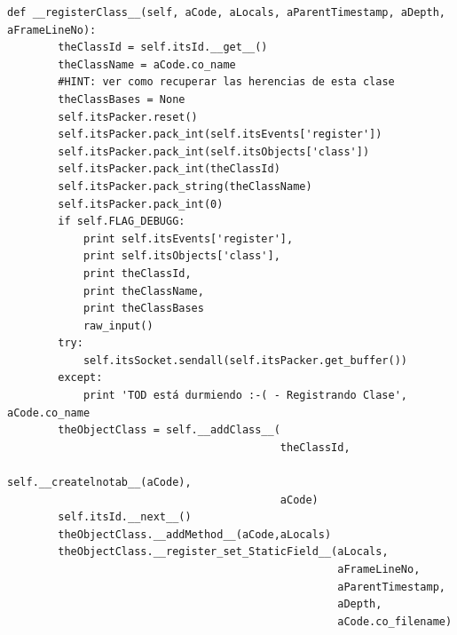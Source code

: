 \documentclass[12pt,legalpaper]{report}
\begin{document}
\begin{singlespace}
\begin{lstlisting}[style=Python]
    def __registerClass__(self, aCode, aLocals, aParentTimestamp, aDepth, aFrameLineNo):
        theClassId = self.itsId.__get__()
        theClassName = aCode.co_name
        #HINT: ver como recuperar las herencias de esta clase 
        theClassBases = None
        self.itsPacker.reset()
        self.itsPacker.pack_int(self.itsEvents['register'])
        self.itsPacker.pack_int(self.itsObjects['class'])
        self.itsPacker.pack_int(theClassId)
        self.itsPacker.pack_string(theClassName)
        self.itsPacker.pack_int(0)
        if self.FLAG_DEBUGG:
            print self.itsEvents['register'],
            print self.itsObjects['class'],
            print theClassId,
            print theClassName,
            print theClassBases
            raw_input()
        try:
            self.itsSocket.sendall(self.itsPacker.get_buffer())
        except:
            print 'TOD está durmiendo :-( - Registrando Clase', aCode.co_name
        theObjectClass = self.__addClass__(
                                           theClassId,
                                           self.__createlnotab__(aCode),
                                           aCode)
        self.itsId.__next__()
        theObjectClass.__addMethod__(aCode,aLocals)
        theObjectClass.__register_set_StaticField__(aLocals,
                                                    aFrameLineNo,
                                                    aParentTimestamp,
                                                    aDepth,
                                                    aCode.co_filename)


\end{lstlisting}
\end{singlespace}
\end{document}
